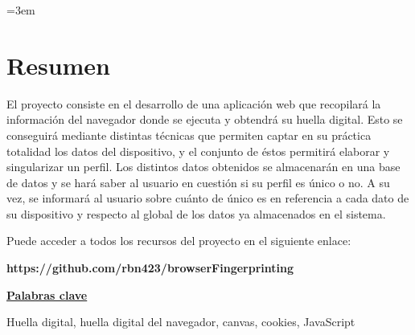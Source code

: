 \parindent=3em
\chapter*{Resumen}

El proyecto consiste en el desarrollo de una aplicación web que recopilará la información del navegador donde se ejecuta y obtendrá su huella digital. Esto se conseguirá mediante distintas técnicas que permiten captar en su práctica totalidad los datos del dispositivo, y el conjunto de éstos permitirá elaborar y singularizar un perfil. Los distintos datos obtenidos se almacenarán en una base de datos y se hará saber al usuario en cuestión si su perfil es único o no. A su vez, se informará al usuario sobre cuánto de único es en referencia a cada dato de su dispositivo y respecto al global de los datos ya almacenados en el sistema. \par

Puede acceder a todos los recursos del proyecto en el siguiente enlace: \par
\noindent
\textbf{https://github.com/rbn423/browserFingerprinting} \par
\vspace{12mm}
\noindent
\underline{\Large{\textbf{Palabras clave}}}\par
\vspace{7mm}
\noindent
\normalsize{Huella digital, huella digital del navegador, canvas, cookies, JavaScript}
